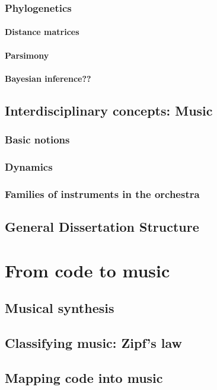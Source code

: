\documentclass[11pt,twoside,a4paper]{report}
\begin{document}
\subsection{Phylogenetics}
\subsubsection{Distance matrices}
\subsubsection{Parsimony}
\subsubsection{Bayesian inference??}

\section{Interdisciplinary concepts: Music}
\subsection{Basic notions}
\subsection{Dynamics}
\subsection{Families of instruments in the orchestra}


\section{General Dissertation Structure}


\chapter{From code to music}
\section{Musical synthesis}
\section{Classifying music: Zipf's law}
\section{Mapping code into music}
\end{document}
